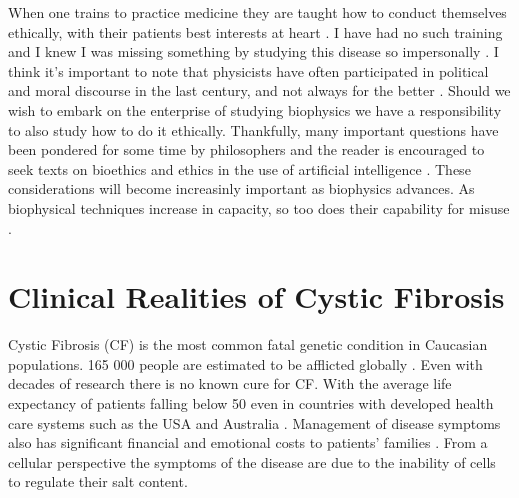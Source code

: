 When one trains to practice medicine they are taught how to conduct themselves ethically, with their patients best interests at heart \cite{hajar2017}. I have had no such training and I knew I was missing something by studying this disease so impersonally \cite{foucault1994}. I think it's important to note that physicists have often participated in political and moral discourse in the last century, and not always for the better \cite{frank1993, gottfried1999, global2009, rhodes1986, aaronson2008, berger2016, vonneumann_britanica}. Should we wish to embark on the enterprise of studying biophysics we have a responsibility to also study how to do it ethically. Thankfully, many important questions have been pondered for some time by philosophers and the reader is encouraged to seek texts on bioethics and ethics in the use of artificial intelligence \cite{buchanan2000, taneri2011, genome_editting_guildelines_2017, muller2021, bostrom2014}. These considerations will become increasinly important as biophysics advances. As biophysical techniques increase in capacity, so too does their capability for misuse \cite{mallapaty2022, urbina2022}. 




\section{Clinical Realities of Cystic Fibrosis}
Cystic Fibrosis (CF) is the most common fatal genetic condition in Caucasian populations. 165 000 people are estimated to be afflicted globally \cite{guo2022}. Even with decades of research there is no known cure for CF. With the average life expectancy of patients falling below 50 even in countries with developed health care systems such as the USA and Australia \cite{mcbennett2022}. Management of disease symptoms also has significant financial and emotional costs to patients' families \cite{vangool2013}. From a cellular perspective the symptoms of the disease are due to the inability of cells to regulate their salt content. 

